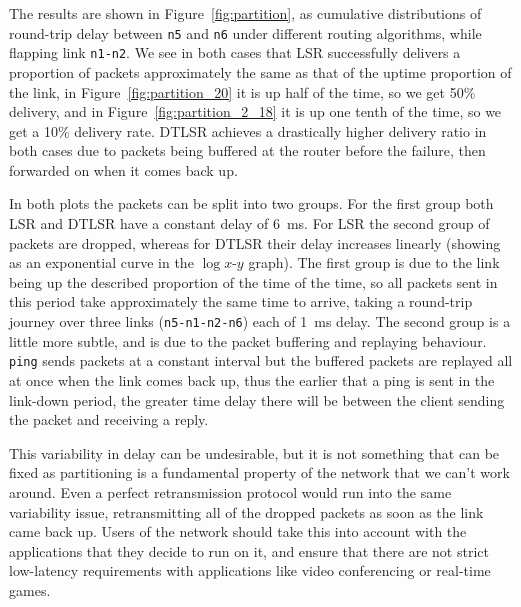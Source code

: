 \documentclass[withindex,glossary,openany]{cam-thesis}
\begin{document}
The results are shown in Figure~\ref{fig:partition}, as cumulative distributions of round-trip delay between \texttt{n5} and \texttt{n6} under different routing algorithms, while flapping link \texttt{n1-n2}. We see in both cases that LSR successfully delivers a proportion of packets approximately the same as that of the uptime proportion of the link, in Figure~\ref{fig:partition_20} it is up half of the time, so we get 50\% delivery, and in Figure~\ref{fig:partition_2_18} it is up one tenth of the time, so we get a 10\% delivery rate. DTLSR achieves a drastically higher delivery ratio in both cases due to packets being buffered at the router before the failure, then forwarded on when it comes back up.

In both plots the packets can be split into two groups. For the first group both LSR and DTLSR have a constant delay of \SI{6}{\ms}. For LSR the second group of packets are dropped, whereas for DTLSR their delay increases linearly (showing as an exponential curve in the $\log x$-$y$ graph). The first group is due to the link being up the described proportion of the time of the time, so all packets sent in this period take approximately the same time to arrive, taking a round-trip journey over three links (\texttt{n5-n1-n2-n6}) each of \SI{1}{\ms} delay. The second group is a little more subtle, and is due to the packet buffering and replaying behaviour. \texttt{ping} sends packets at a constant interval but the buffered packets are replayed all at once when the link comes back up, thus the earlier that a ping is sent in the link-down period, the greater time delay there will be between the client sending the packet and receiving a reply.

This variability in delay can be undesirable, but it is not something that can be fixed as partitioning is a fundamental property of the network that we can't work around. Even a perfect retransmission protocol would run into the same variability issue, retransmitting all of the dropped packets as soon as the link came back up. Users of the network should take this into account with the applications that they decide to run on it, and ensure that there are not strict low-latency requirements with applications like video conferencing or real-time games.
\end{document}
